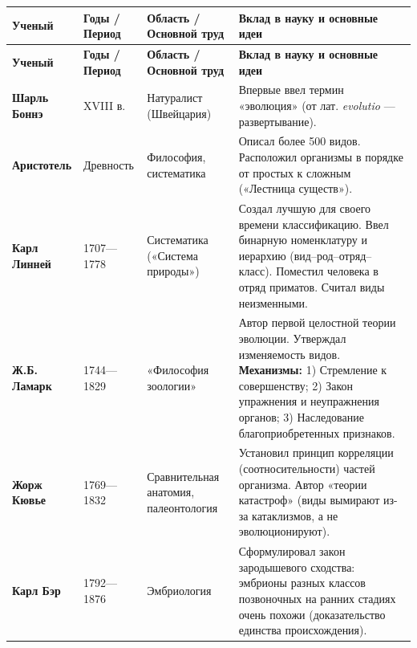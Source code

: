 \documentclass[12pt]{article}
\begin{document}
	\begin{xltabular}{\textwidth}{|p{3cm}|p{2.5cm}|>{\raggedright\arraybackslash}X|>{\raggedright\arraybackslash}X|}
		\hline
		\textbf{Ученый} & \textbf{Годы / Период} & \textbf{Область / Основной труд} & \textbf{Вклад в науку и основные идеи}\\
		\hline
		\endfirsthead
		
		\hline
		\textbf{Ученый} & \textbf{Годы / Период} & \textbf{Область / Основной труд} & \textbf{Вклад в науку и основные идеи}\\
		\hline
		\endhead
		
		\hline
		\endfoot
		
		\hline
		\endlastfoot
		
		\textbf{Шарль Боннэ} & XVIII в. & Натуралист (Швейцария) & Впервые ввел термин «эволюция» (от лат. \textit{evolutio} — развертывание).\\
		\hline
		
		\textbf{Аристотель} & Древность & Философия, систематика & Описал более 500 видов. Расположил организмы в порядке от простых к сложным («Лестница существ»).\\
		\hline
		
		\textbf{Карл Линней} & 1707—1778 & Систематика («Система природы») & Создал лучшую для своего времени классификацию. Ввел бинарную номенклатуру и иерархию (вид–род–отряд–класс). Поместил человека в отряд приматов. Считал виды неизменными.\\
		\hline
		
		\textbf{Ж.Б. Ламарк} & 1744—1829 & «Философия зоологии» & Автор первой целостной теории эволюции. Утверждал изменяемость видов. \newline \textbf{Механизмы:} 1) Стремление к совершенству; 2) Закон упражнения и неупражнения органов; 3) Наследование благоприобретенных признаков.\\
		\hline
		
		\textbf{Жорж Кювье} & 1769—1832 & Сравнительная анатомия, палеонтология & Установил принцип корреляции (соотносительности) частей организма. Автор «теории катастроф» (виды вымирают из-за катаклизмов, а не эволюционируют).\\
		\hline
		
		\textbf{Карл Бэр} & 1792—1876 & Эмбриология & Сформулировал закон зародышевого сходства: эмбрионы разных классов позвоночных на ранних стадиях очень похожи (доказательство единства происхождения).\\
		\hline
		

\end{xltabular}
\end{document}
